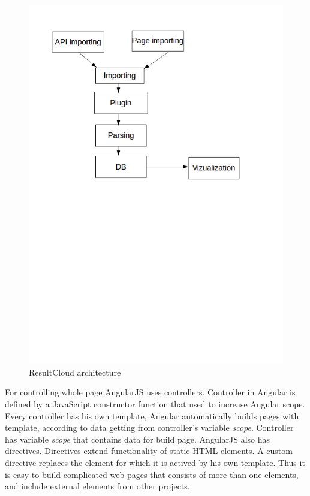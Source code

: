 \begin{figure}
  \centering
    \includegraphics[trim=0 13.41cm 0 0,scale=0.5]{fig/result-cloud.png}
  \caption{ResultCloud architecture}
  \label{fig:result_cloud}
\end{figure}

For controlling whole page AngularJS uses controllers. Controller in Angular is defined by a JavaScript constructor function that used to increase Angular scope. Every controller has his own template, Angular automatically builds pages with template, according to data getting from controller's variable \emph{scope}. Controller has variable \emph{scope} that contains data for build page. AngularJS also has directives. Directives extend functionality of static HTML elements. A custom directive replaces the element for which it is actived by his own template. Thus it is easy to build complicated web pages that consists of more than one elements, and include external elements from other projects.

